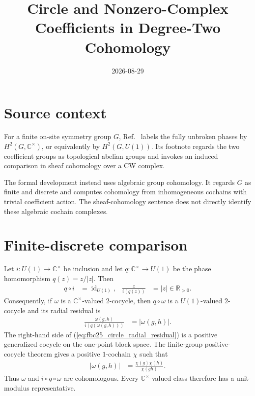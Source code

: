 \documentclass{article}
\title{Circle and Nonzero-Complex Coefficients in Degree-Two Cohomology}
\author{}
\date{2026-08-29}
\begin{document}
\maketitle
{}

\section{Source context}

For a finite on-site symmetry group $G$, Ref.~\cite[lines~1927--1931]{FrancoRubio2025MPUGauging}
labels the fully unbroken phases by $H^2(G,\mathbb C^\times)$, or equivalently
by $H^2(G,U(1))$.  Its footnote regards the two coefficient groups as
topological abelian groups and invokes an induced comparison in sheaf
cohomology over a CW complex.

The formal development instead uses algebraic group cohomology.  It regards
$G$ as finite and discrete and computes cohomology from inhomogeneous cochains
with trivial coefficient action.  The sheaf-cohomology sentence does not
directly identify these algebraic cochain complexes.

\section{Finite-discrete comparison}

Let $i:U(1)\longrightarrow\mathbb C^\times$ be inclusion and let
$q:\mathbb C^\times\longrightarrow U(1)$ be the phase homomorphism
$q(z)=z/|z|$.  Then
\begin{align}
    q\circ i
     & =\operatorname{id}_{U(1)},
     &
    \frac{z}{i(q(z))}
     & =|z|\in\mathbb R_{>0}.
    \label{eq:fbc25_circle_polar_retraction}
\end{align}
Consequently, if $\omega$ is a $\mathbb C^\times$-valued $2$-cocycle, then
$q\circ\omega$ is a $U(1)$-valued $2$-cocycle and its radial residual is
\begin{align}
    \frac{\omega(g,h)}{i(q(\omega(g,h)))}
     & =|\omega(g,h)|.
    \label{eq:fbc25_circle_radial_residual}
\end{align}
The right-hand side of
(\ref{eq:fbc25_circle_radial_residual}) is a positive generalized cocycle on
the one-point block space.  The finite-group positive-cocycle theorem gives a
positive $1$-cochain $\chi$ such that
\begin{align}
    |\omega(g,h)|
     & =\frac{\chi(g)\chi(h)}{\chi(gh)}.
    \label{eq:fbc25_circle_positive_coboundary}
\end{align}
Thus $\omega$ and $i\circ q\circ\omega$ are cohomologous.  Every
$\mathbb C^\times$-valued class therefore has a unit-modulus representative.
\end{document}
